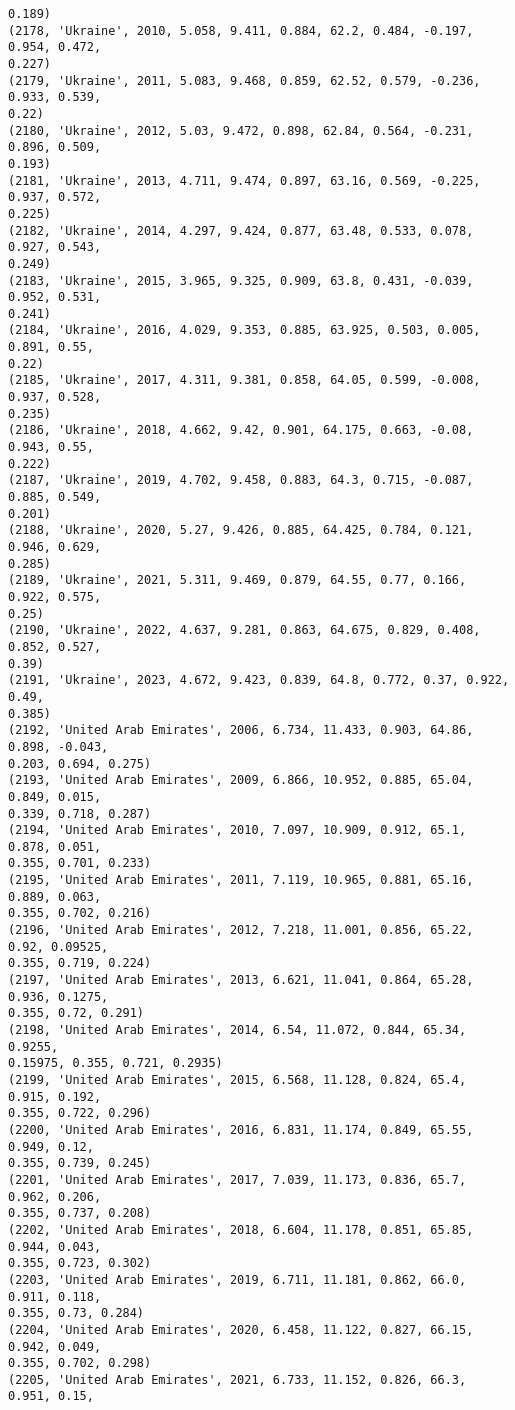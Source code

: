 \documentclass[11pt]{article}
\begin{document}
\begin{Verbatim}[commandchars=\\\{\}]
0.189)
(2178, 'Ukraine', 2010, 5.058, 9.411, 0.884, 62.2, 0.484, -0.197, 0.954, 0.472,
0.227)
(2179, 'Ukraine', 2011, 5.083, 9.468, 0.859, 62.52, 0.579, -0.236, 0.933, 0.539,
0.22)
(2180, 'Ukraine', 2012, 5.03, 9.472, 0.898, 62.84, 0.564, -0.231, 0.896, 0.509,
0.193)
(2181, 'Ukraine', 2013, 4.711, 9.474, 0.897, 63.16, 0.569, -0.225, 0.937, 0.572,
0.225)
(2182, 'Ukraine', 2014, 4.297, 9.424, 0.877, 63.48, 0.533, 0.078, 0.927, 0.543,
0.249)
(2183, 'Ukraine', 2015, 3.965, 9.325, 0.909, 63.8, 0.431, -0.039, 0.952, 0.531,
0.241)
(2184, 'Ukraine', 2016, 4.029, 9.353, 0.885, 63.925, 0.503, 0.005, 0.891, 0.55,
0.22)
(2185, 'Ukraine', 2017, 4.311, 9.381, 0.858, 64.05, 0.599, -0.008, 0.937, 0.528,
0.235)
(2186, 'Ukraine', 2018, 4.662, 9.42, 0.901, 64.175, 0.663, -0.08, 0.943, 0.55,
0.222)
(2187, 'Ukraine', 2019, 4.702, 9.458, 0.883, 64.3, 0.715, -0.087, 0.885, 0.549,
0.201)
(2188, 'Ukraine', 2020, 5.27, 9.426, 0.885, 64.425, 0.784, 0.121, 0.946, 0.629,
0.285)
(2189, 'Ukraine', 2021, 5.311, 9.469, 0.879, 64.55, 0.77, 0.166, 0.922, 0.575,
0.25)
(2190, 'Ukraine', 2022, 4.637, 9.281, 0.863, 64.675, 0.829, 0.408, 0.852, 0.527,
0.39)
(2191, 'Ukraine', 2023, 4.672, 9.423, 0.839, 64.8, 0.772, 0.37, 0.922, 0.49,
0.385)
(2192, 'United Arab Emirates', 2006, 6.734, 11.433, 0.903, 64.86, 0.898, -0.043,
0.203, 0.694, 0.275)
(2193, 'United Arab Emirates', 2009, 6.866, 10.952, 0.885, 65.04, 0.849, 0.015,
0.339, 0.718, 0.287)
(2194, 'United Arab Emirates', 2010, 7.097, 10.909, 0.912, 65.1, 0.878, 0.051,
0.355, 0.701, 0.233)
(2195, 'United Arab Emirates', 2011, 7.119, 10.965, 0.881, 65.16, 0.889, 0.063,
0.355, 0.702, 0.216)
(2196, 'United Arab Emirates', 2012, 7.218, 11.001, 0.856, 65.22, 0.92, 0.09525,
0.355, 0.719, 0.224)
(2197, 'United Arab Emirates', 2013, 6.621, 11.041, 0.864, 65.28, 0.936, 0.1275,
0.355, 0.72, 0.291)
(2198, 'United Arab Emirates', 2014, 6.54, 11.072, 0.844, 65.34, 0.9255,
0.15975, 0.355, 0.721, 0.2935)
(2199, 'United Arab Emirates', 2015, 6.568, 11.128, 0.824, 65.4, 0.915, 0.192,
0.355, 0.722, 0.296)
(2200, 'United Arab Emirates', 2016, 6.831, 11.174, 0.849, 65.55, 0.949, 0.12,
0.355, 0.739, 0.245)
(2201, 'United Arab Emirates', 2017, 7.039, 11.173, 0.836, 65.7, 0.962, 0.206,
0.355, 0.737, 0.208)
(2202, 'United Arab Emirates', 2018, 6.604, 11.178, 0.851, 65.85, 0.944, 0.043,
0.355, 0.723, 0.302)
(2203, 'United Arab Emirates', 2019, 6.711, 11.181, 0.862, 66.0, 0.911, 0.118,
0.355, 0.73, 0.284)
(2204, 'United Arab Emirates', 2020, 6.458, 11.122, 0.827, 66.15, 0.942, 0.049,
0.355, 0.702, 0.298)
(2205, 'United Arab Emirates', 2021, 6.733, 11.152, 0.826, 66.3, 0.951, 0.15,

\end{Verbatim}
\end{document}
